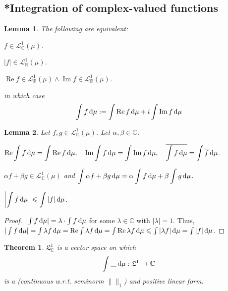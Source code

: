 \documentclass[11pt, a4paper, openany]{book}
\newtheorem{thm}{Theorem}\newtheorem{lem}{Lemma}\newtheorem{crl}{Corollary}
\theoremstyle{definition}
\DeclareMathOperator{\RE}{Re}
\DeclareMathOperator{\IM}{Im}
\newcommand{\ph}{\underline{\hspace{0.3cm}}}
\newenvironment{tight_enumerate}{\begin{enumerate}\itemsep -0.2em}{\end{enumerate}}
\begin{document}
\subsection{*Integration of complex-valued functions}
    \begin{lem}
        The following are equivalent:
        \begin{tight_enumerate}
            \item $f\in \mathcal{L}^1_{\mathbb{C}}(\mu)$.
            \item $|f|\in \mathcal{L}^1_{\mathbb{R}}(\mu)$.
            \item $\RE{f}\in\mathcal{L}^1_{\mathbb{R}}(\mu)\wedge\IM{f}\in\mathcal{L}^1_{\mathbb{R}}(\mu)$.
        \end{tight_enumerate}
        in which case
        \[
        \int f\odif \mu:=\int \RE{f}\odif \mu+i\int\IM{f}\odif \mu
    \]
    \end{lem}
    \begin{lem}
        Let $f,g\in \mathcal{L}^1_{\mathbb{C}}(\mu)$. Let $\alpha,\beta\in\mathbb{C}$.
        \begin{tight_enumerate}
            \item $\displaystyle \RE\int f\odif\mu=\int \RE f\odif\mu,\quad \IM\int f\odif\mu=\int \IM f\odif\mu,\quad \overline{\int f\odif \mu}=\int \overline{f}\odif \mu$.
            \item $\alpha f+\beta g\in \mathcal{L}^1_{\mathbb{C}}(\mu)$ and $\displaystyle \int \alpha f+\beta g\odif \mu=\alpha\int f\odif \mu+\beta\int g\odif \mu$.
            \item $\displaystyle \left|\int f\odif \mu\right|\leqslant\int |f|\odif \mu$.
        \end{tight_enumerate}
    \end{lem}
    \begin{proof}
        $|\int f\odif \mu|=\lambda\cdot \int f\odif\mu$ for some $\lambda\in\mathbb{C}$ with $|\lambda|=1$. Thus, $|\int f\odif \mu|=\int \lambda f\odif\mu=\RE \int \lambda f\odif\mu=\int \RE \lambda f\odif\mu\leqslant \int |\lambda f|\odif \mu=\int |f|\odif \mu$.
    \end{proof}
    \begin{thm}\label{linearity of the integral on L^1_C}
        $\mathfrak{L}_\mathbb{C}^1$ is a vector space on which
        \[
            \int \ph\odif \mu:\mathfrak{L}^1\rightarrow \mathbb{C}
        \]
        is a (continuous w.r.t. seminorm $\|\|_1$) and positive linear form.
    \end{thm}
\end{document}
